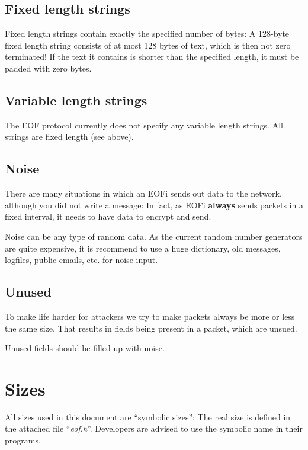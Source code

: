 \documentclass[12pt,a4paper]{book}
\begin{document}
\subsection{Fixed length strings}
Fixed length strings contain exactly the specified number of bytes:
A 128-byte fixed length string consists of at most 128 bytes of text,
which is then not zero terminated!
If the text it contains is shorter than the specified length,
it must be padded with zero bytes.
\subsection{Variable length strings}
The EOF protocol currently does not specify any variable length strings.
All strings are fixed length (see above).
\subsection{Noise}
There are many situations in which an EOFi sends out data to the network,
although you did not write a message: In fact, as EOFi \textbf{always}
sends packets in a fixed interval, it needs to have data to encrypt and send.

Noise can be any type of random data. As the current random number generators
are quite expensive, it is recommend to use a huge dictionary, old
messages, logfiles, public emails, etc. for noise input.

\subsection{Unused}
To make life harder for attackers we try to make packets always be more or
less the same size. That results in fields being present in a packet, which
are unsued.

Unused fields should be filled up with noise.
\section{Sizes}
%
All sizes used in this document are "`symbolic sizes"': The real size
is defined in the attached file "`\emph{eof.h}"'.
Developers are advised to use the symbolic name in their programs.
\end{document}
